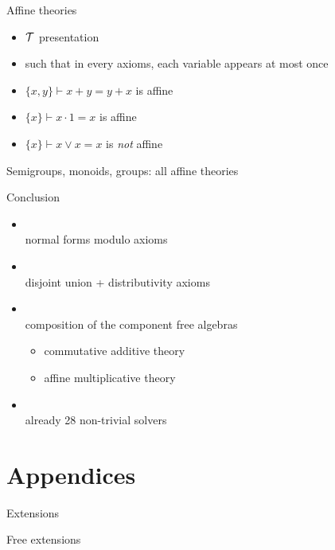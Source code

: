 \documentclass[10pt, english, xcolor={dvipsnames}]{beamer}
\begin{document}
\begin{frame}[t]{Affine theories}
  \begin{itemize}
    \item $\mathcal{T}$ presentation
    \item such that in every axioms, each variable appears at most once
  \end{itemize}

  \vspace{0.3cm}

  \begin{itemize}
    \item $\{x, y\} \vdash x + y = y + x$ is affine
    \item $\{x\} \vdash x \cdot 1 = x$ is affine
    \item $\{x\} \vdash x \vee x = x$ is \emph{not} affine
  \end{itemize}

  Semigroups, monoids, groups: all affine theories
\end{frame}


\begin{frame}{Conclusion}
  \begin{itemize}
    \item {}\\ normal forms modulo axioms
    \item {}\\ disjoint union + distributivity axioms
    \item {}\\ composition of the component free algebras \begin{itemize}
      \item commutative additive theory
      \item affine multiplicative theory
    \end{itemize}
    \item {}\\ already 28 non-trivial solvers
  \end{itemize}
\end{frame}

\appendix
\backupbegin

\section*{Appendices}

\begin{frame}
	\sectionpage
\end{frame}

\begin{frame}{Extensions}
\end{frame}

\begin{frame}{Free extensions}
\end{frame}

\backupend
\end{document}
